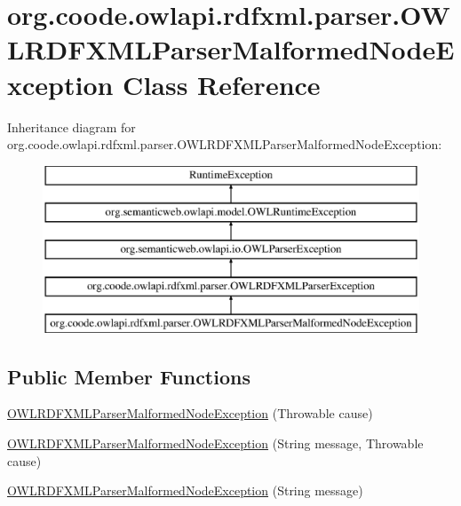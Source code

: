 \hypertarget{classorg_1_1coode_1_1owlapi_1_1rdfxml_1_1parser_1_1_o_w_l_r_d_f_x_m_l_parser_malformed_node_exception}{\section{org.\-coode.\-owlapi.\-rdfxml.\-parser.\-O\-W\-L\-R\-D\-F\-X\-M\-L\-Parser\-Malformed\-Node\-Exception Class Reference}
\label{classorg_1_1coode_1_1owlapi_1_1rdfxml_1_1parser_1_1_o_w_l_r_d_f_x_m_l_parser_malformed_node_exception}
}
Inheritance diagram for org.\-coode.\-owlapi.\-rdfxml.\-parser.\-O\-W\-L\-R\-D\-F\-X\-M\-L\-Parser\-Malformed\-Node\-Exception\-:\begin{figure}[H]
\begin{center}
\leavevmode
\includegraphics[height=5.000000cm]{classorg_1_1coode_1_1owlapi_1_1rdfxml_1_1parser_1_1_o_w_l_r_d_f_x_m_l_parser_malformed_node_exception}
\end{center}
\end{figure}
\subsection*{Public Member Functions}
\begin{DoxyCompactItemize}
\item 
\hyperlink{classorg_1_1coode_1_1owlapi_1_1rdfxml_1_1parser_1_1_o_w_l_r_d_f_x_m_l_parser_malformed_node_exception_af8b20c836b057ffd9e9438e23d5c3233}{O\-W\-L\-R\-D\-F\-X\-M\-L\-Parser\-Malformed\-Node\-Exception} (Throwable cause)
\item 
\hyperlink{classorg_1_1coode_1_1owlapi_1_1rdfxml_1_1parser_1_1_o_w_l_r_d_f_x_m_l_parser_malformed_node_exception_abc18050bab82649d45a55e8a583cac1f}{O\-W\-L\-R\-D\-F\-X\-M\-L\-Parser\-Malformed\-Node\-Exception} (String message, Throwable cause)
\item 
\hyperlink{classorg_1_1coode_1_1owlapi_1_1rdfxml_1_1parser_1_1_o_w_l_r_d_f_x_m_l_parser_malformed_node_exception_a1d14cdd0180408e66d313a9df66c5250}{O\-W\-L\-R\-D\-F\-X\-M\-L\-Parser\-Malformed\-Node\-Exception} (String message)
\end{DoxyCompactItemize}
